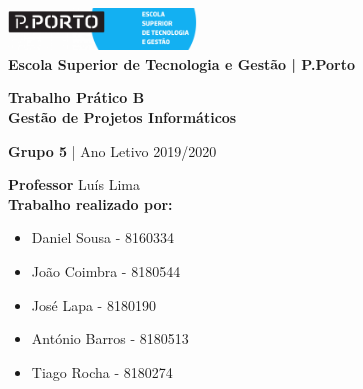 \documentclass[12pt]{article}
\begin{document}
\graphicspath{ {media/} }
\begin{titlepage}

\center

\includegraphics[width=5cm]{estg.png}\\[1cm]
\textbf{Escola Superior de Tecnologia e Gestão | P.Porto}\\[0.5cm]

\vfill

\linespread{1.2}\huge {\bfseries Trabalho Prático B}\\[0.5cm]
\large{\textbf{Gestão de Projetos Informáticos}}

\normalsize{\textbf{Grupo 5} | Ano Letivo 2019/2020}

\vfill

\endcenter

\begin{flushleft}

\textbf{Professor} Luís Lima\\[0.65cm]

\textbf{\small Trabalho realizado por:}\\[0cm]

\begin{itemize}
	\item{\small Daniel Sousa - 8160334}\\[0cm]
	\item{\small João Coimbra - 8180544}\\[0cm]
	\item{\small José Lapa - 8180190}\\[0cm]
	\item{\small António Barros - 8180513}\\[0cm]
	\item{\small Tiago Rocha - 8180274}

\end{itemize}

\end{flushleft}

\end{titlepage}
\pagestyle{fancy}
\fancyhf{}
\end{document}
